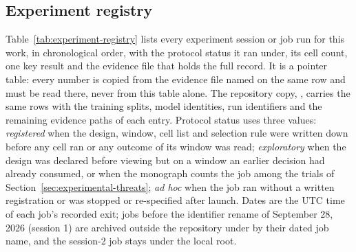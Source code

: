 \begin{apendicesenv}
\partapendices



\chapter{Experiment registry} \label{app:experiment-registry}

Table~\ref{tab:experiment-registry} lists every experiment session or job run for this work, in chronological order, with the protocol status it ran under, its cell count, one key result and the evidence file that holds the full record. It is a pointer table: every number is copied from the evidence file named on the same row and must be read there, never from this table alone. The repository copy, , carries the same rows with the training splits, model identities, run identifiers and the remaining evidence paths of each entry. Protocol status uses three values: \emph{registered} when the design, window, cell list and selection rule were written down before any cell ran or any outcome of its window was read; \emph{exploratory} when the design was declared before viewing but on a window an earlier decision had already consumed, or when the monograph counts the job among the trials of Section~\ref{sec:experimental-threats}; \emph{ad hoc} when the job ran without a written registration or was stopped or re-specified after launch. Dates are the UTC time of each job's recorded exit; jobs before the identifier rename of September 28, 2026 (session 1) are archived outside the repository under  by their dated job name, and the session-2 job stays under the local  root.


\end{apendicesenv}

